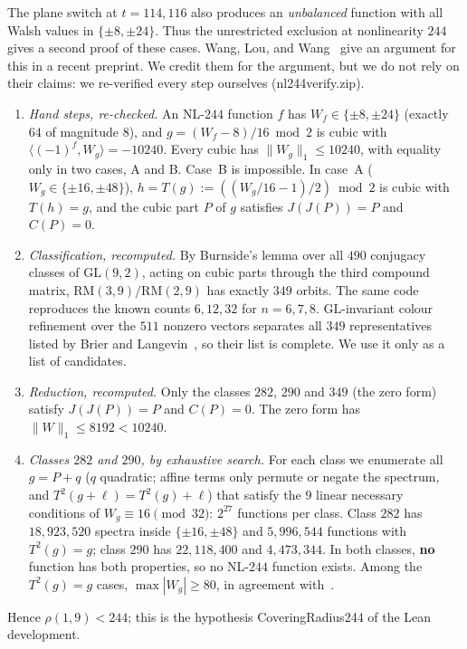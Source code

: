 \documentclass[11pt]{article}
\theoremstyle{definition}
\newcommand{\code}[1]{{\ttfamily\small\renewcommand{\_}{\textunderscore\allowbreak}#1}}
\begin{document}
The plane switch at $t = 114, 116$ also produces an \emph{unbalanced} function with all Walsh values in $\{\pm 8, \pm 24\}$. Thus the unrestricted exclusion at nonlinearity $244$ gives a second proof of these cases.
Wang, Lou, and Wang~\cite{WLW2026} give an argument for this in a recent preprint.
We credit them for the argument, but we do not rely on their claims: we re-verified every step ourselves (\code{nl244\_verify.zip}).
\begin{enumerate}[nosep]
  \item \emph{Hand steps, re-checked.} An NL-$244$ function $f$ has $W_f \in \{\pm 8, \pm 24\}$ (exactly $64$ of magnitude $8$), and $g = (W_f - 8)/16 \bmod 2$ is cubic with $\langle (-1)^f, W_g\rangle = -10240$. Every cubic has $\|W_g\|_1 \le 10240$, with equality only in two cases, A and B. Case~B is impossible. In case~A ($W_g \in \{\pm 16, \pm 48\}$), $h = T(g) := ((W_g/16 - 1)/2) \bmod 2$ is cubic with $T(h) = g$, and the cubic part $P$ of $g$ satisfies $J(J(P)) = P$ and $C(P) = 0$.
  \item \emph{Classification, recomputed.} By Burnside's lemma over all $490$ conjugacy classes of $\mathrm{GL}(9,2)$, acting on cubic parts through the third compound matrix, $\mathrm{RM}(3,9)/\mathrm{RM}(2,9)$ has exactly $349$ orbits. The same code reproduces the known counts $6, 12, 32$ for $n = 6, 7, 8$. $\mathrm{GL}$-invariant colour refinement over the $511$ nonzero vectors separates all $349$ representatives listed by Brier and Langevin~\cite{BL2003}, so their list is complete. We use it only as a list of candidates.
  \item \emph{Reduction, recomputed.} Only the classes $282$, $290$ and $349$ (the zero form) satisfy $J(J(P)) = P$ and $C(P) = 0$. The zero form has $\|W\|_1 \le 8192 < 10240$.
  \item \emph{Classes $282$ and $290$, by exhaustive search.} For each class we enumerate all $g = P + q$ ($q$ quadratic; affine terms only permute or negate the spectrum, and $T^2(g + \ell) = T^2(g) + \ell$) that satisfy the $9$ linear necessary conditions of $W_g \equiv 16 \pmod{32}$: $2^{27}$ functions per class. Class $282$ has $18{,}923{,}520$ spectra inside $\{\pm 16, \pm 48\}$ and $5{,}996{,}544$ functions with $T^2(g) = g$; class $290$ has $22{,}118{,}400$ and $4{,}473{,}344$. In both classes, \textbf{no} function has both properties, so no NL-$244$ function exists. Among the $T^2(g) = g$ cases, $\max|W_g| \ge 80$, in agreement with~\cite[Table~1]{WLW2026}.
\end{enumerate}
Hence $\rho(1,9) < 244$; this is the hypothesis \code{CoveringRadius244} of the Lean development.
\end{document}
